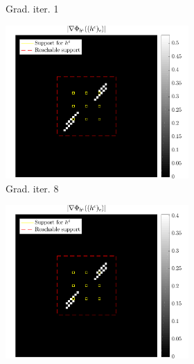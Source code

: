 \begin{figure}[!ht]
\begin{subfigure}[b]{0.49\linewidth}
\begin{subfigure}[b]{0.49\linewidth}
	\caption{Grad. iter. 1}
	\end{subfigure}
	\begin{subfigure}[b]{0.49\linewidth}\centering
	\includegraphics[width=\linewidth]{figures/xp_grad_iterations/xp_128x128_sc2_angl1_K3_S3_node4_iter8_partgrad4_bestvalues.pdf}
	\caption{Grad. iter. 8}
	\end{subfigure}
	\begin{subfigure}[b]{0.49\linewidth}\centering
	\includegraphics[width=\linewidth]{figures/xp_grad_iterations/xp_128x128_sc2_angl1_K3_S3_node4_iter20_partgrad4_bestvalues.pdf}

\end{subfigure}
\end{subfigure}
\end{figure}

